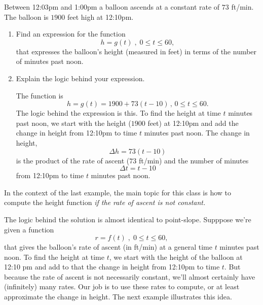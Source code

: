 \documentclass{ximera}
\begin{document}
\begin{example}  \label{Ex:IUDFr3f3fgl}
Between 12:03pm and 1:00pm a balloon ascends at a constant rate of $73$ ft/min. The balloon is $1900$ feet high at 12:10pm.

\begin{enumerate}
\item Find an expression for the function 
\[
       h=g(t)\; , \; 0\leq t \leq 60, 
\]
that expresses the balloon's height (measured in feet) in terms of the number of minutes past noon.

\item Explain the logic behind your expression.

\begin{explanation}
The function is
\[
    h = g(t) = 1900 + 73(t-10) \, , \, 0\leq t \leq 60.
\]
The logic behind the expression is this. To find the height at time $t$ minutes past noon, we start with the height ($1900$ feet) at 12:10pm and add the change in height from 12:10pm to time $t$ minutes past noon. The change in height,
\[
   \Delta h = 73(t-10)
\]
is the product of the rate of ascent ($73$ ft/min) and the number of minutes
\[
  \Delta t = t - 10
\]
from 12:10pm to time $t$ minutes past noon.
\end{explanation}
\end{enumerate}
\end{example}

In the context of the last example, the main topic for this class is how to compute the height function \emph{if the rate of ascent is not constant.}

The logic behind the solution is almost identical to point-slope. Supppose we're given a function
\[
   r =f(t) \; , \; 0\leq t \leq 60, 
\]
that gives the balloon's rate of ascent (in ft/min) at a general time $t$ minutes past noon. To find the height at time $t$, we start with the height of the balloon at 12:10 pm and add to that the change in height from 12:10pm to time $t$. But because the rate of ascent is not necessarily constant, we'll almost certainly have (infinitely) many rates. Our job is to use these rates to compute, or at least approximate the change in height. The next example illustrates this idea.
\end{document}
